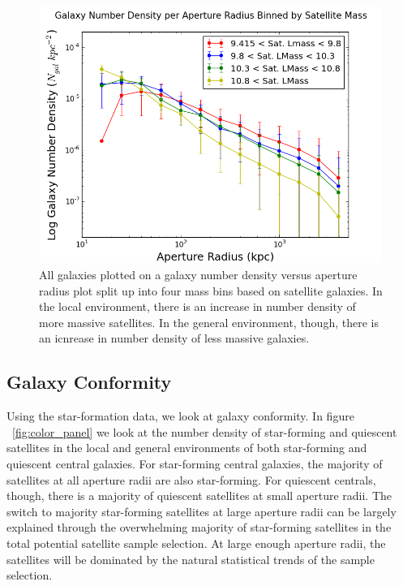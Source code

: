 \documentclass[apj]{emulateapj}
\begin{document}
\begin{figure}
\centering
\graphicspath{{C:/3d_hst/2015_finals/aperture_distance/}}
\includegraphics[width=\linewidth]{temp_lmasspanel_final}
\caption{\footnotesize All galaxies plotted on a galaxy number density versus aperture radius plot split up into four mass bins based on satellite galaxies. In the local environment, there is an increase in number density of more massive satellites. In the general environment, though, there is an icnrease in number density of less massive galaxies.}
\label{fig:mass_sat}
\end{figure}

\subsection{Galaxy Conformity}

Using the star-formation data, we look at galaxy conformity. In figure ~\ref{fig:color_panel} we look at the number density of star-forming and quiescent satellites in the local and general environments of both star-forming and quiescent central galaxies. For star-forming central galaxies, the majority of satellites at all aperture radii are also star-forming. For quiescent centrals, though, there is a majority of quiescent satellites at small aperture radii. The switch to majority star-forming satellites at large aperture radii can be largely explained through the overwhelming majority of star-forming satellites in the total potential satellite sample selection. At large enough aperture radii, the satellites will be dominated by the natural statistical trends of the sample selection. 
\end{document}
